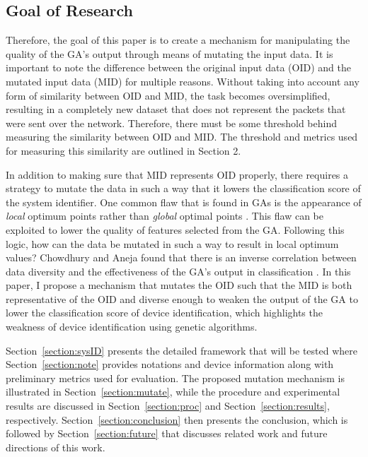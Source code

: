 \documentclass[11pt, titlepage]{article}
\begin{document}
	\subsection{Goal of Research}
	Therefore, the goal of this paper is to create a mechanism for manipulating the quality of the GA’s output  through means of mutating the input data. It is important to note the difference between the original input data (OID) and the mutated input data (MID) for multiple reasons. Without taking into account any form of similarity between OID and MID, the task becomes oversimplified, resulting in a completely new dataset that does not represent the packets that were sent over the network. Therefore, there must be some threshold behind measuring the similarity between OID and MID. The threshold and metrics used for measuring this similarity are outlined in Section 2.

	In addition to making sure that MID represents OID properly, there requires a strategy to mutate the data in such a way that it lowers the classification score of the system identifier. One common flaw that is found in GAs is the appearance of \textit{local} optimum points rather than \textit{global} optimal points \cite{Automated}. This flaw can be exploited to lower the quality of features selected from the GA. Following this logic, how can the data be mutated in such a way to result in local optimum values? Chowdhury and Aneja found that there is an inverse correlation between data diversity and the effectiveness of the GA’s output in classification \cite{Network}. In this paper, I propose a mechanism that mutates the OID such that the MID is both representative of the OID and diverse enough to weaken the output of the GA to lower the classification score of device identification, which highlights the weakness of device identification using genetic algorithms. 

Section~\ref{section:sysID} presents the detailed framework that will be tested where Section~\ref{section:note} provides notations and device information along with preliminary metrics used for evaluation. The proposed mutation mechanism is illustrated in Section~\ref{section:mutate}, while the procedure and experimental results are discussed in Section~\ref{section:proc} and Section~\ref{section:results}, respectively. Section~\ref{section:conclusion} then presents the conclusion, which is followed by Section~\ref{section:future} that discusses related work and future directions of this work.

\Note

\SysID

\Mutate

\Proc

\Results

\Conclusion

\Future

\printbibliography
\end{document}

